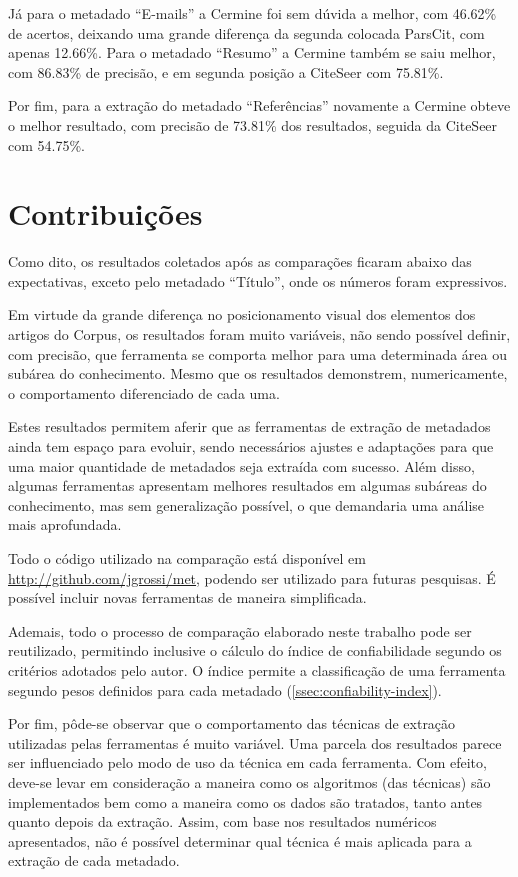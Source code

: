 Já para o metadado ``E-mails'' a Cermine foi sem dúvida a melhor, com 46.62\% de acertos, deixando uma grande diferença da segunda colocada ParsCit, com apenas 12.66\%. 
Para o metadado ``Resumo'' a Cermine também se saiu melhor, com 86.83\% de precisão, e em segunda posição a CiteSeer com 75.81\%.

Por fim, para a extração do metadado ``Referências'' novamente a Cermine obteve o melhor resultado, com precisão de 73.81\% dos resultados, seguida da CiteSeer com 54.75\%.

\section{Contribuições}
\label{sec:contributions}

Como dito, os resultados coletados após as comparações ficaram abaixo das expectativas, exceto pelo metadado ``Título'', onde os números foram expressivos.

Em virtude da grande diferença no posicionamento visual dos elementos dos artigos do Corpus, os resultados foram muito variáveis, não sendo possível definir, com precisão, que ferramenta se comporta melhor para uma determinada área ou subárea do conhecimento.
Mesmo que os resultados demonstrem, numericamente, o comportamento diferenciado de cada uma.

Estes resultados permitem aferir que as ferramentas de extração de metadados ainda tem espaço para evoluir, sendo necessários ajustes e adaptações para que uma maior quantidade de metadados seja extraída com sucesso. 
Além disso, algumas ferramentas apresentam melhores resultados em algumas subáreas do conhecimento, mas sem generalização possível, o que demandaria uma análise mais aprofundada.

Todo o código utilizado na comparação está disponível em \url{http://github.com/jgrossi/met}, podendo ser utilizado para futuras pesquisas. É possível incluir novas ferramentas de maneira simplificada.

Ademais, todo o processo de comparação elaborado neste trabalho pode ser reutilizado, permitindo inclusive o cálculo do índice de confiabilidade segundo os critérios adotados pelo autor. 
O índice permite a classificação de uma ferramenta segundo pesos definidos para cada metadado (\autoref{ssec:confiability-index}).

Por fim, pôde-se observar que o comportamento das técnicas de extração utilizadas pelas ferramentas é muito variável.
Uma parcela dos resultados parece ser influenciado pelo modo de uso da técnica em cada ferramenta.
Com efeito, deve-se levar em consideração a maneira como os algoritmos (das técnicas) são implementados bem como a maneira como os dados são tratados, tanto antes quanto depois da extração. 
Assim, com base nos resultados numéricos apresentados, não é possível determinar qual técnica é mais aplicada para a extração de cada metadado.

